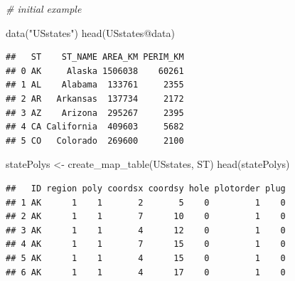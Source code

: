 \documentclass[
]{krantz}
\makeatletter
\newenvironment{Shaded}{\begin{snugshade}}{\end{snugshade}}
\newcommand{\CommentTok}[1]{\textcolor[rgb]{0.37,0.37,0.37}{\textit{#1}}}
\newcommand{\FunctionTok}[1]{\textcolor[rgb]{0,0,0}{#1}}
\newcommand{\NormalTok}[1]{#1}
\newcommand{\OtherTok}[1]{\textcolor[rgb]{0.37,0.37,0.37}{#1}}
\newcommand{\SpecialCharTok}[1]{\textcolor[rgb]{0,0,0}{#1}}
\newcommand{\StringTok}[1]{\textcolor[rgb]{0.5,0.5,0.5}{#1}}
\newenvironment{kframe}{%
\medskip{}
\setlength{\fboxsep}{.8em}
 \def\at@end@of@kframe{}%
 \ifinner\ifhmode%
  \def\at@end@of@kframe{\end{minipage}}%
  \begin{minipage}{\columnwidth}%
 \fi\fi%
 \def\FrameCommand##1{\hskip\@totalleftmargin \hskip-\fboxsep
 \colorbox{shadecolor}{##1}\hskip-\fboxsep
     \hskip-\linewidth \hskip-\@totalleftmargin \hskip\columnwidth}%
 \MakeFramed {\advance\hsize-\width
   \@totalleftmargin\z@ \linewidth\hsize
   \@setminipage}}%
 {\par\unskip\endMakeFramed%
 \at@end@of@kframe}
\renewenvironment{Shaded}{\begin{kframe}}{\end{kframe}}
\makeatother
\begin{document}
\begin{Shaded}
\begin{Highlighting}[]
\CommentTok{\# initial example}

\FunctionTok{data}\NormalTok{(}\StringTok{"USstates"}\NormalTok{)}
\FunctionTok{head}\NormalTok{(USstates}\SpecialCharTok{@}\NormalTok{data)}
\end{Highlighting}
\end{Shaded}

\begin{verbatim}
##   ST    ST_NAME AREA_KM PERIM_KM
## 0 AK     Alaska 1506038    60261
## 1 AL    Alabama  133761     2355
## 2 AR   Arkansas  137734     2172
## 3 AZ    Arizona  295267     2395
## 4 CA California  409603     5682
## 5 CO   Colorado  269600     2100
\end{verbatim}

\begin{Shaded}
\begin{Highlighting}[]
\NormalTok{statePolys }\OtherTok{\textless{}{-}} \FunctionTok{create\_map\_table}\NormalTok{(USstates, }\StringTok{\textquotesingle{}ST\textquotesingle{}}\NormalTok{)}
\FunctionTok{head}\NormalTok{(statePolys)}
\end{Highlighting}
\end{Shaded}

\begin{verbatim}
##   ID region poly coordsx coordsy hole plotorder plug
## 1 AK      1    1       2       5    0         1    0
## 2 AK      1    1       7      10    0         1    0
## 3 AK      1    1       4      12    0         1    0
## 4 AK      1    1       7      15    0         1    0
## 5 AK      1    1       4      15    0         1    0
## 6 AK      1    1       4      17    0         1    0
\end{verbatim}
\end{document}

